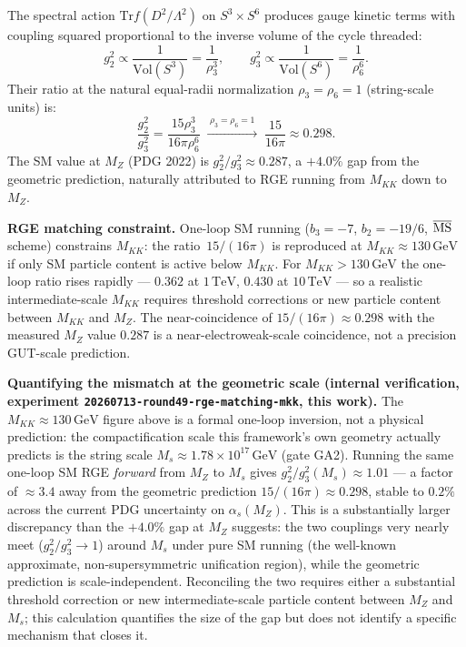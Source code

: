 \documentclass[12pt,a4paper]{article}
\newcommand{\Vol}{\mathrm{Vol}}
\newcommand{\Tr}{\mathrm{Tr}}
\begin{document}
The spectral action $\Tr f(D^2/\Lambda^2)$ on $S^3\times S^6$ produces gauge kinetic terms
with coupling squared proportional to the inverse volume of the cycle threaded:
\begin{equation}
  g_2^2 \propto \frac{1}{\Vol(S^3)} = \frac{1}{\rho_3^3}, \qquad
  g_3^2 \propto \frac{1}{\Vol(S^6)} = \frac{1}{\rho_6^6}.
\end{equation}
Their ratio at the natural equal-radii normalization $\rho_3=\rho_6=1$ (string-scale units) is:
\begin{equation}
  \label{eq:coupling-ratio}
  \frac{g_2^2}{g_3^2} = \frac{15\rho_3^3}{16\pi\rho_6^6}
  \;\xrightarrow{\;\rho_3=\rho_6=1\;}\;
  \frac{15}{16\pi} \approx 0.298.
\end{equation}
The SM value at $M_Z$ (PDG 2022) is $g_2^2/g_3^2\approx 0.287$, a $+4.0\%$ gap from
the geometric prediction, naturally attributed to RGE running from $M_{KK}$ down to $M_Z$.

\textbf{RGE matching constraint.} One-loop SM running ($b_3=-7$, $b_2=-19/6$, $\overline{\rm MS}$
scheme) constrains $M_{KK}$: the ratio~$15/(16\pi)$ is reproduced at
$M_{KK}\approx 130\,\mathrm{GeV}$ if only SM particle content is active below $M_{KK}$.
For $M_{KK}>130\,\mathrm{GeV}$ the one-loop ratio rises rapidly --- $0.362$ at $1\,\mathrm{TeV}$,
$0.430$ at $10\,\mathrm{TeV}$ --- so a realistic intermediate-scale $M_{KK}$ requires threshold
corrections or new particle content between $M_{KK}$ and $M_Z$. The near-coincidence of
$15/(16\pi)\approx 0.298$ with the measured $M_Z$ value $0.287$ is a near-electroweak-scale
coincidence, not a precision GUT-scale prediction.

\textbf{Quantifying the mismatch at the geometric scale (internal verification, experiment
\texttt{20260713-round49-rge-matching-mkk}, this work).} The $M_{KK}\approx 130\,\mathrm{GeV}$
figure above is a formal one-loop inversion, not a physical prediction: the compactification
scale this framework's own geometry actually predicts is the string scale
$M_s\approx 1.78\times 10^{17}\,\mathrm{GeV}$ (gate GA2). Running the same one-loop SM RGE
\emph{forward} from $M_Z$ to $M_s$ gives $g_2^2/g_3^2(M_s)\approx 1.01$ --- a factor of
$\approx 3.4$ away from the geometric prediction $15/(16\pi)\approx 0.298$, stable to $0.2\%$
across the current PDG uncertainty on $\alpha_s(M_Z)$. This is a substantially larger
discrepancy than the $+4.0\%$ gap at $M_Z$ suggests: the two couplings very nearly meet
($g_2^2/g_3^2\to 1$) around $M_s$ under pure SM running (the well-known approximate,
non-supersymmetric unification region), while the geometric prediction is scale-independent.
Reconciling the two requires either a substantial threshold correction or new intermediate-scale
particle content between $M_Z$ and $M_s$; this calculation quantifies the size of the gap but
does not identify a specific mechanism that closes it.
\end{document}
